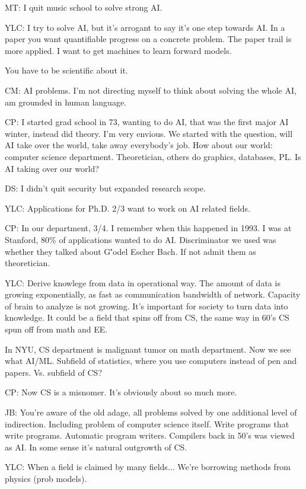 \begin{enumerate}
MT: I quit music school to solve strong AI.

YLC: I try to solve AI, but it's arrogant to say it's one step towards AI. In a paper you want quantifiable progress on a concrete problem. The paper trail is more applied. I want to get machines to learn forward models.

You have to be scientific about it.

CM: AI problems. I'm not directing myself to think about solving the whole AI, am grounded in human language.

CP: I started grad school in 73, wanting to do AI, that was the first major AI winter, instead did theory. I'm very envious. We started with the question, will AI take over the world, take away everybody's job. How about our world: computer science department. Theoretician, others do graphics, databases, PL. Is AI taking over our world?

DS: I didn't quit security but expanded research scope.

YLC: Applications for Ph.D. 2/3 want to work on AI related fields. 

CP: In our department, 3/4. I remember when this happened in 1993. I was at Stanford, 80\% of applications wanted to do AI. Discriminator we used was whether they talked about G\''odel Escher Bach. If not admit them as theoretician.

YLC: Derive knowlege from data in operational way. The amount of data is growing exponentially, as fast as communication bandwidth of network. %
Capacity of brain to analyze is not growing. It's  important for society to turn data into knowledge. It could be a field that spins off from CS, the same way in 60's CS spun off from math and EE. 

In NYU, CS department is malignant tumor on math department. Now we see what AI/ML. Subfield of statistics, where you use computers instead of pen and papers. Vs. subfield of CS?

CP: Now CS is a misnomer. It's obviously about so much more. 

JB: You're aware of the old adage, all problems solved by one additional level of indirection. Including problem of computer science itself. Write programs that write programs. Automatic program writers. Compilers back in 50's was viewed as AI. In some sense it's natural outgrowth of CS.

YLC: When a field is claimed by many fields...
We're borrowing methods from physics (prob models). 
\end{enumerate}